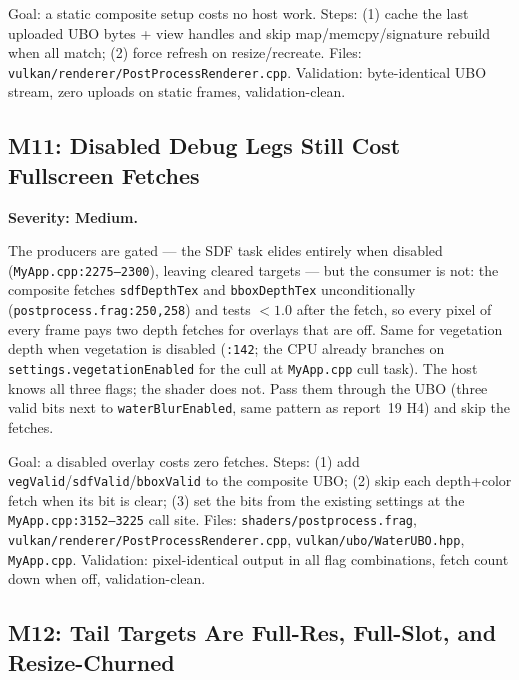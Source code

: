 \documentclass[11pt,a4paper]{article}
\begin{document}
\begin{tcolorbox}[promptbox={Prompt --- M10: change-gated composite upload}]
Goal: a static composite setup costs no host work. Steps: (1) cache the last
uploaded UBO bytes + view handles and skip map/memcpy/signature rebuild when
all match; (2) force refresh on resize/recreate. Files:
\texttt{vulkan/renderer/PostProcessRenderer.cpp}. Validation: byte-identical
UBO stream, zero uploads on static frames, validation-clean.
\end{tcolorbox}

\subsection{M11: Disabled Debug Legs Still Cost Fullscreen Fetches}
\label{sec:m11}

\textbf{Severity: Medium.}

The producers are gated --- the SDF task elides entirely when disabled
(\texttt{MyApp.cpp:2275--2300}), leaving cleared targets --- but the
consumer is not: the composite fetches \texttt{sdfDepthTex} and
\texttt{bboxDepthTex} unconditionally (\texttt{postprocess.frag:250,258}) and
tests \texttt{$< 1.0$} after the fetch, so every pixel of every frame pays
two depth fetches for overlays that are off. Same for vegetation depth when
vegetation is disabled (\texttt{:142}; the CPU already branches on
\texttt{settings.vegetationEnabled} for the cull at \texttt{MyApp.cpp}
cull task). The host knows all three flags; the shader does not. Pass them
through the UBO (three valid bits next to \texttt{waterBlurEnabled}, same
pattern as report~19 H4) and skip the fetches.

\begin{tcolorbox}[promptbox={Prompt --- M11: valid-bit the debug/veg fetches}]
Goal: a disabled overlay costs zero fetches. Steps: (1) add
\texttt{vegValid}/\texttt{sdfValid}/\texttt{bboxValid} to the composite UBO;
(2) skip each depth+color fetch when its bit is clear; (3) set the bits from
the existing settings at the \texttt{MyApp.cpp:3152--3225} call site. Files:
\texttt{shaders/postprocess.frag},
\texttt{vulkan/renderer/PostProcessRenderer.cpp},
\texttt{vulkan/ubo/WaterUBO.hpp}, \texttt{MyApp.cpp}. Validation:
pixel-identical output in all flag combinations, fetch count down when off,
validation-clean.
\end{tcolorbox}

\subsection{M12: Tail Targets Are Full-Res, Full-Slot, and Resize-Churned}
\label{sec:m12}
\end{document}
